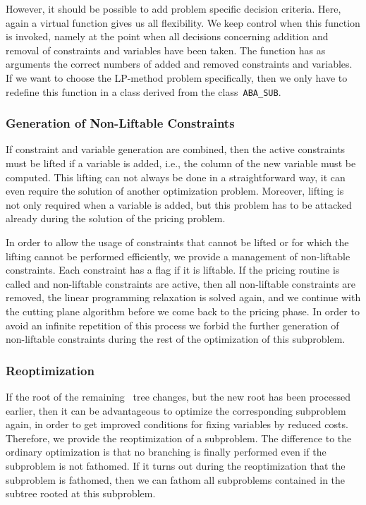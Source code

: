 However, it should be possible to add problem specific decision criteria.
Here, again a virtual function gives us all flexibility. 
We keep
control when this function is invoked, namely at the point when all decisions
concerning addition and removal of constraints and variables have been taken.
The function has as arguments
the correct numbers of added and removed constraints and variables.
If we want to choose the LP-method problem specifically, then we
only have to redefine this function in a class derived from the
class~{\tt ABA\_SUB}.

\subsubsection{Generation of Non-Liftable Constraints}
\label{section:DesignNonLiftable}

If constraint and variable generation are combined, then the
active constraints must be lifted if a variable is added, i.e.,
the column of the new variable must be computed. This lifting can
not always be done in a straightforward way, it can even require
the solution of another optimization problem. Moreover, lifting
is not only required when a variable is added, but this problem
has to be attacked already during the solution of the pricing problem.

In order to allow the usage of constraints that cannot be lifted or
for which the lifting cannot be performed efficiently, we provide
a management of non-liftable constraints. Each constraint has
a flag if it is liftable. If the pricing routine is called
and non-liftable constraints are active, then all non-liftable constraints
are removed, the linear programming relaxation is solved again, and we
continue with the cutting plane algorithm before we come back to the
pricing phase.
In order to avoid an infinite repetition of this process we forbid the
further generation of non-liftable constraints during the rest
of the optimization of this subproblem.

\subsubsection{Reoptimization}

If the root of the remaining \bab\ tree changes, but the new root
has been processed earlier, then it can be advantageous to optimize
the corresponding subproblem again, in order to get improved conditions for
fixing variables by reduced costs. Therefore, we provide the reoptimization
of a subproblem. The difference to the ordinary optimization is that
no branching is finally performed even if the subproblem is not
fathomed. If it turns out during the reoptimization that the subproblem
is fathomed, then we can fathom all subproblems
contained in the subtree rooted at this subproblem.


